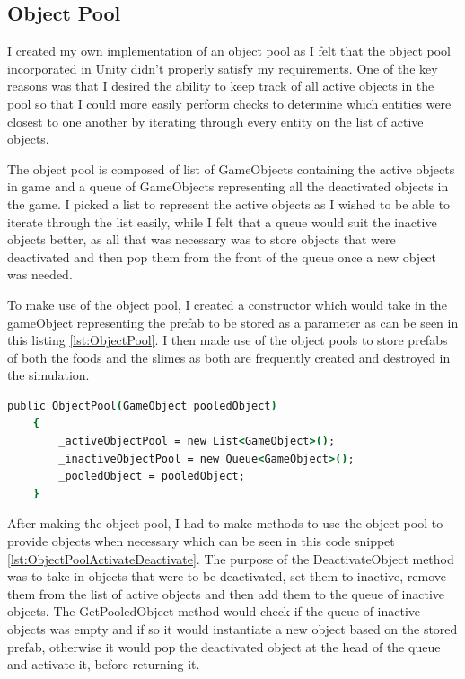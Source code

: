 \subsection{Object Pool}
I created my own implementation of an object pool as I felt that the object pool incorporated in Unity didn't properly satisfy my requirements. One of the key reasons was that I desired the ability to keep track of all active objects in the pool so that I could more easily perform checks to determine which entities were closest to one another by iterating through every entity on the list of active objects.
\par
The object pool is composed of list of GameObjects containing the active objects in game and a queue of GameObjects representing all the deactivated objects in the game. I picked a list to represent the active objects as I wished to be able to iterate through the list easily, while I felt that a queue would suit the inactive objects better, as all that was necessary was to store objects that were deactivated and then pop them from the front of the queue once a new object was needed.
\par
To make use of the object pool, I created a constructor which would take in the gameObject representing the prefab to be stored as a parameter as can be seen in this listing \ref{lst:ObjectPool}. I then made use of the object pools to store prefabs of both the foods and the slimes as both are frequently created and destroyed in the simulation.
\begin{lstlisting}[language=csh, caption=Object pool, label={lst:ObjectPool}]
    public ObjectPool(GameObject pooledObject)
    {
        _activeObjectPool = new List<GameObject>();
        _inactiveObjectPool = new Queue<GameObject>();
        _pooledObject = pooledObject;
    }
\end{lstlisting}
\par
After making the object pool, I had to make methods to use the object pool to provide objects when necessary which can be seen in this code snippet \ref{lst:ObjectPoolActivateDeactivate}. The purpose of the DeactivateObject method was to take in objects that were to be deactivated, set them to inactive, remove them from the list of active objects and then add them to the queue of inactive objects. The GetPooledObject method would check if the queue of inactive objects was empty and if so it would instantiate a new object based on the stored prefab, otherwise it would pop the deactivated object at the head of the queue and activate it, before returning it.
